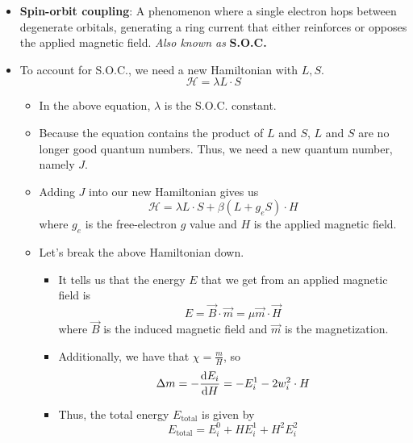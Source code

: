 \documentclass[../notes.tex]{subfiles}
\begin{document}
\begin{itemize}
\begin{itemize}
\begin{itemize}
        \end{itemize}
    \end{itemize}
    \item \textbf{Spin-orbit coupling}: A phenomenon where a single electron hops between degenerate orbitals, generating a ring current that either reinforces or opposes the applied magnetic field. \emph{Also known as} \textbf{S.O.C.}
    \item To account for S.O.C., we need a new Hamiltonian with $L,S$.
    \begin{equation*}
        \mathcal{H} = \lambda L\cdot S
    \end{equation*}
    \begin{itemize}
        \item In the above equation, $\lambda$ is the S.O.C. constant.
        \item Because the equation contains the product of $L$ and $S$, $L$ and $S$ are no longer good quantum numbers. Thus, we need a new quantum number, namely $J$.
        \item Adding $J$ into our new Hamiltonian gives us
        \begin{equation*}
            \mathcal{H} = \lambda L\cdot S+\beta(L+g_eS)\cdot H
        \end{equation*}
        where $g_e$ is the free-electron $g$ value and $H$ is the applied magnetic field.
        \item Let's break the above Hamiltonian down.
        \begin{itemize}
            \item It tells us that the energy $E$ that we get from an applied magnetic field is
            \begin{equation*}
                E = \vec{B}\cdot\vec{m}
                = \mu\vec{m}\cdot\vec{H}
            \end{equation*}
            where $\vec{B}$ is the induced magnetic field and $\vec{m}$ is the magnetization.
            \item Additionally, we have that $\chi=\frac{m}{H}$, so
            \begin{equation*}
                \Delta m = -\dv{E_i}{H}
                = -E_i^1-2w_i^2\cdot H
            \end{equation*}
            \item Thus, the total energy $E_\text{total}$ is given by
            \begin{equation*}
                E_\text{total} = E_i^0+HE_i^1+H^2E_i^2
            \end{equation*}

\end{itemize}
\end{itemize}
\end{itemize}
\end{document}
